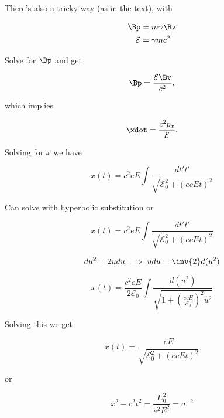 There's also a tricky way (as in the text), with 

\begin{align}\label{eqn:relativisticElectrodynamicsT3:160}
\Bp &= m \gamma \Bv  \\
\mathcal{E} &= \gamma m c^2 
\end{align}

Solve for $\Bp$ and get

\begin{equation}\label{eqn:relativisticElectrodynamicsT3:180}
\Bp = \frac{\mathcal{E} \Bv}{c^2},
\end{equation}

which implies

\begin{equation}\label{eqn:relativisticElectrodynamicsT3:200}
\xdot = \frac{c^2 p_x}{\mathcal{E}}.
\end{equation}

Solving for $x$ we have

\begin{equation}\label{eqn:relativisticElectrodynamicsT3:220}
x(t) = c^2 e E \int \frac{dt' t'}{\sqrt{ \mathcal{E}_0^2 + (e c E t)^2 }}
\end{equation}

Can solve with hyperbolic substitution or

\begin{equation}\label{eqn:relativisticElectrodynamicsT3:240}
x(t) = c^2 e E \int \frac{dt' t'}{\sqrt{ \mathcal{E}_0^2 + (e c E t)^2 }}
\end{equation}

\begin{equation}\label{eqn:relativisticElectrodynamicsT3:260}
du^2 = 2 u du \implies u du = \inv{2} d(u^2)
\end{equation}

\begin{equation}\label{eqn:relativisticElectrodynamicsT3:280}
x(t) = \frac{c^2 e E}{2 \mathcal{E}_0} \int \frac{d (u^2)}{\sqrt{ 1 + \left(\frac{e c E}{\mathcal{E}_0}\right)^2 u^2 }}
\end{equation}

Solving this we get

\begin{equation}\label{eqn:relativisticElectrodynamicsT3:300}
x(t) = \frac{e E}{\sqrt{ \mathcal{E}_0^2 + (e c E t)^2 }}
\end{equation}

or

\begin{equation}\label{eqn:relativisticElectrodynamicsT3:320}
x^2 - c^2 t^2 = \frac{E_0^2}{ e^2 E^2 } = a^{-2}
\end{equation}


